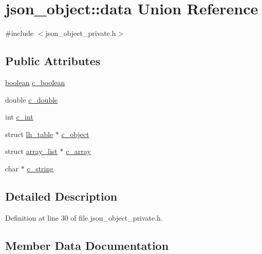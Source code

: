 \hypertarget{unionjson__object_1_1data}{}\section{json\+\_\+object\+:\+:data Union Reference}
\label{unionjson__object_1_1data}


{\ttfamily \#include $<$json\+\_\+object\+\_\+private.\+h$>$}

\subsection*{Public Attributes}
\begin{DoxyCompactItemize}
\item 
\hyperlink{json__object_8h_a621c38f1f10a1c565d897e3178b16d6e}{boolean} \hyperlink{unionjson__object_1_1data_ace8860a384f47f7cbe7e656eb2632fc0}{c\+\_\+boolean}
\item 
double \hyperlink{unionjson__object_1_1data_a9cc4abdb21302913701ac0c8dc75e55a}{c\+\_\+double}
\item 
int \hyperlink{unionjson__object_1_1data_a397c3575aeea167c47dff9594d1e4aab}{c\+\_\+int}
\item 
struct \hyperlink{structlh__table}{lh\+\_\+table} $\ast$ \hyperlink{unionjson__object_1_1data_a68089c942f154d4df590d8ecb476a69b}{c\+\_\+object}
\item 
struct \hyperlink{structarray__list}{array\+\_\+list} $\ast$ \hyperlink{unionjson__object_1_1data_a4ad6bf2fd6d8718f55850509edfe2e45}{c\+\_\+array}
\item 
char $\ast$ \hyperlink{unionjson__object_1_1data_a2749f46b4691f85695cecb9f4e365321}{c\+\_\+string}
\end{DoxyCompactItemize}


\subsection{Detailed Description}


Definition at line 30 of file json\+\_\+object\+\_\+private.\+h.



\subsection{Member Data Documentation}
\mbox{\label{unionjson__object_1_1data_a4ad6bf2fd6d8718f55850509edfe2e45}} 
